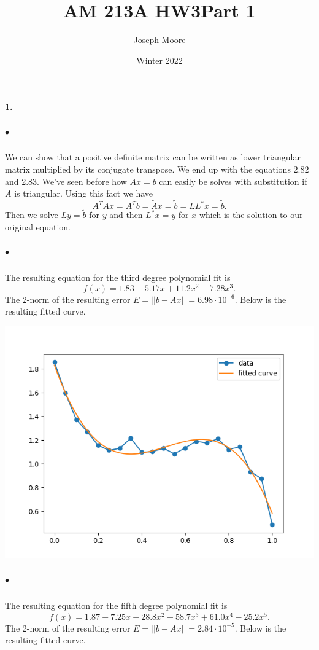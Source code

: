 \documentclass[12pt]{article}
\title{AM 213A HW3}
\author{Joseph Moore}
\date{Winter 2022}
\begin{document}
\maketitle

\title{\textbf{Part 1}}


\paragraph{1.}
	\subparagraph{$\bullet$}
		We can show that a positive definite matrix can be written as lower triangular matrix multiplied by its conjugate transpose. We end up with the equations 2.82 and 2.83. We've seen before how $Ax = b$ can easily be solves with substitution if $A$ is triangular. Using this fact we have
    	\[
    	A^TAx = A^Tb = \tilde{A}x = \tilde{b} = LL^*x = \tilde{b}.
    	\] 
    	Then we solve $Ly = \tilde{b}$ for $y$ and then $L^*x = y$ for $x$ which is the solution to our original equation.
    
    \subparagraph{$\bullet$}
    	The resulting equation for the third degree polynomial fit is 
    	\[
    	f(x) = 1.83 - 5.17x + 11.2x^2 - 7.28x^3.
    	\]
    	The 2-norm of the resulting error $E = ||b - Ax|| = 6.98\cdot10^{-6}$. Below is the resulting fitted curve.
    	
    	\includegraphics[scale=0.7]{Figure_1}
    	
    \subparagraph{$\bullet$}
    	The resulting equation for the fifth degree polynomial fit is 
    	\[
    	f(x) = 1.87 - 7.25x + 28.8x^2 - 58.7x^3 + 61.0x^4 - 25.2x^5.
    	\]
    	The 2-norm of the resulting error $E = ||b - Ax|| = 2.84\cdot10^{-5}$. Below is the resulting fitted curve.
    	
\end{document}
